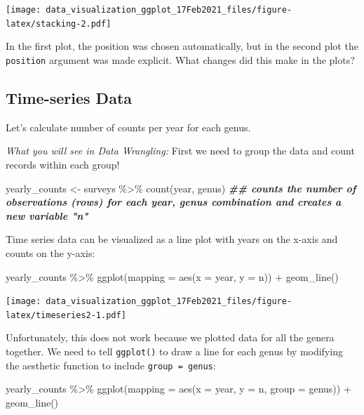 \documentclass[
]{article}
\newenvironment{Shaded}{\begin{snugshade}}{\end{snugshade}}
\newcommand{\AttributeTok}[1]{\textcolor[rgb]{0.77,0.63,0.00}{#1}}
\newcommand{\DocumentationTok}[1]{\textcolor[rgb]{0.56,0.35,0.01}{\textbf{\textit{#1}}}}
\newcommand{\FunctionTok}[1]{\textcolor[rgb]{0.00,0.00,0.00}{#1}}
\newcommand{\NormalTok}[1]{#1}
\newcommand{\OtherTok}[1]{\textcolor[rgb]{0.56,0.35,0.01}{#1}}
\newcommand{\SpecialCharTok}[1]{\textcolor[rgb]{0.00,0.00,0.00}{#1}}
\begin{document}
\texttt{[image: data\_visualization\_ggplot\_17Feb2021\_files/figure-latex/stacking-2.pdf]}

In the first plot, the position was chosen automatically, but in the
second plot the \texttt{position} argument was made explicit. What
changes did this make in the plots?

\hypertarget{time-series-data}{%
\subsection{Time-series Data}\label{time-series-data}}

Let's calculate number of counts per year for each genus.

\emph{What you will see in Data Wrangling:} First we need to group the
data and count records within each group!

\begin{Shaded}
\begin{Highlighting}[]
\NormalTok{yearly\_counts }\OtherTok{\textless{}{-}}\NormalTok{ surveys }\SpecialCharTok{\%\textgreater{}\%}
  \FunctionTok{count}\NormalTok{(year, genus) }
\DocumentationTok{\#\# counts the number of observations (rows) for each year, genus combination and creates a new variable "n"}
\end{Highlighting}
\end{Shaded}

Time series data can be visualized as a line plot with years on the
x-axis and counts on the y-axis:

\begin{Shaded}
\begin{Highlighting}[]
\NormalTok{yearly\_counts }\SpecialCharTok{\%\textgreater{}\%} 
  \FunctionTok{ggplot}\NormalTok{(}\AttributeTok{mapping =} \FunctionTok{aes}\NormalTok{(}\AttributeTok{x =}\NormalTok{ year, }\AttributeTok{y =}\NormalTok{ n)) }\SpecialCharTok{+}
  \FunctionTok{geom\_line}\NormalTok{()}
\end{Highlighting}
\end{Shaded}

\texttt{[image: data\_visualization\_ggplot\_17Feb2021\_files/figure-latex/timeseries2-1.pdf]}

Unfortunately, this does not work because we plotted data for all the
genera together. We need to tell \texttt{ggplot()} to draw a line for
each genus by modifying the aesthetic function to include
\texttt{group\ =\ genus}:

\begin{Shaded}
\begin{Highlighting}[]
\NormalTok{yearly\_counts }\SpecialCharTok{\%\textgreater{}\%} 
  \FunctionTok{ggplot}\NormalTok{(}\AttributeTok{mapping =} \FunctionTok{aes}\NormalTok{(}\AttributeTok{x =}\NormalTok{ year, }\AttributeTok{y =}\NormalTok{ n, }\AttributeTok{group =}\NormalTok{ genus)) }\SpecialCharTok{+}
  \FunctionTok{geom\_line}\NormalTok{()}
\end{Highlighting}
\end{Shaded}
\end{document}
